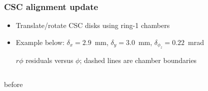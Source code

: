 \documentclass[compress]{beamer}
\begin{document}
\begin{frame}
\frametitle{CSC alignment update}

\begin{itemize}
\item Translate/rotate CSC disks using ring-1 chambers
\item Example below: $\delta_x = 2.9$~mm, $\delta_y = 3.0$~mm, $\delta_{\phi_z} = 0.22$~mrad

$r\phi$ residuals versus $\phi$; dashed lines are chamber boundaries
\end{itemize}

\begin{columns}
\centering

 before


\end{columns}
\end{frame}
\end{document}
